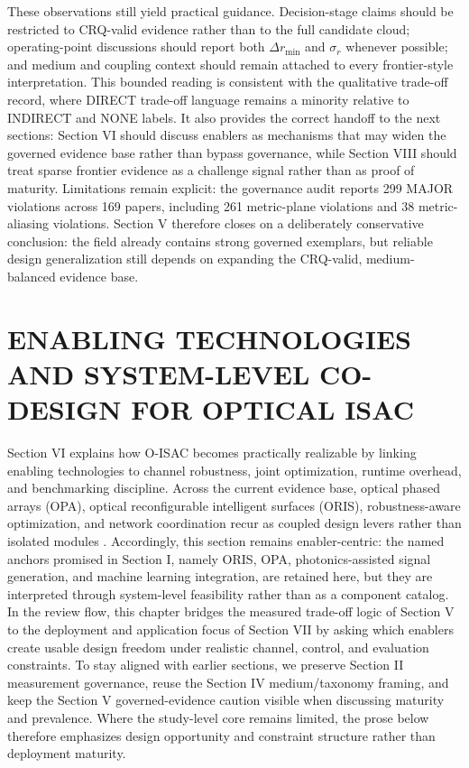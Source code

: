 \documentclass[lettersize,journal]{IEEEtran}
\begin{document}
These observations still yield practical guidance. Decision-stage claims should be restricted to CRQ-valid evidence rather than to the full candidate cloud; operating-point discussions should report both $\Delta r_{\min}$ and $\sigma_r$ whenever possible; and medium and coupling context should remain attached to every frontier-style interpretation. This bounded reading is consistent with the qualitative trade-off record, where DIRECT trade-off language remains a minority relative to INDIRECT and NONE labels. It also provides the correct handoff to the next sections: Section VI should discuss enablers as mechanisms that may widen the governed evidence base rather than bypass governance, while Section VIII should treat sparse frontier evidence as a challenge signal rather than as proof of maturity. Limitations remain explicit: the governance audit reports 299 MAJOR violations across 169 papers, including 261 metric-plane violations and 38 metric-aliasing violations. Section V therefore closes on a deliberately conservative conclusion: the field already contains strong governed exemplars, but reliable design generalization still depends on expanding the CRQ-valid, medium-balanced evidence base.




\section{ENABLING TECHNOLOGIES AND SYSTEM-LEVEL CO-DESIGN FOR OPTICAL ISAC}

Section VI explains how O-ISAC becomes practically realizable by linking enabling technologies to channel robustness, joint optimization, runtime overhead, and benchmarking discipline. Across the current evidence base, optical phased arrays (OPA), optical reconfigurable intelligent surfaces (ORIS), robustness-aware optimization, and network coordination recur as coupled design levers rather than isolated modules \cite{O_ISAC_008,O_ISAC_023,O_ISAC_061,O_ISAC_091,O_ISAC_098,O_ISAC_112,O_ISAC_127}. Accordingly, this section remains enabler-centric: the named anchors promised in Section I, namely ORIS, OPA, photonics-assisted signal generation, and machine learning integration, are retained here, but they are interpreted through system-level feasibility rather than as a component catalog. In the review flow, this chapter bridges the measured trade-off logic of Section V to the deployment and application focus of Section VII by asking which enablers create usable design freedom under realistic channel, control, and evaluation constraints. To stay aligned with earlier sections, we preserve Section II measurement governance, reuse the Section IV medium/taxonomy framing, and keep the Section V governed-evidence caution visible when discussing maturity and prevalence. Where the study-level core remains limited, the prose below therefore emphasizes design opportunity and constraint structure rather than deployment maturity.
\end{document}
